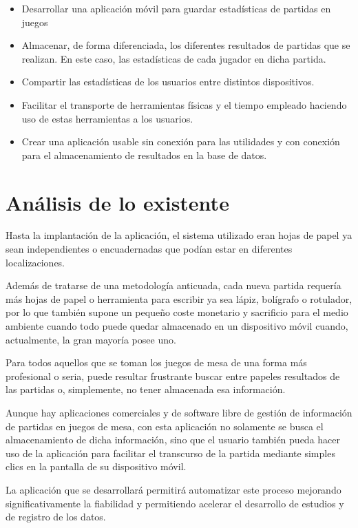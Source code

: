 \begin{itemize}
    \item Desarrollar una aplicación móvil para guardar estadísticas de partidas en juegos
    \item Almacenar, de forma diferenciada, los diferentes resultados de partidas que se realizan. En este caso, las estadísticas de cada jugador en dicha partida.
    \item Compartir las estadísticas de los usuarios entre distintos dispositivos.
    \item Facilitar el transporte de herramientas físicas y el tiempo empleado haciendo uso de estas herramientas a los usuarios.
    \item Crear una aplicación usable sin conexión para las utilidades y con conexión para el almacenamiento de resultados en la base de datos.
\end{itemize}

\newpage

\section{Análisis de lo existente}

Hasta la implantación de la aplicación, el sistema utilizado eran hojas de papel ya sean independientes o encuadernadas que podían estar en diferentes localizaciones.

Además de tratarse de una metodología anticuada, cada nueva partida requería más hojas de papel o herramienta para escribir ya sea lápiz, bolígrafo o rotulador, por lo que también supone un pequeño coste monetario y sacrificio para el medio ambiente cuando todo puede quedar almacenado en un dispositivo móvil cuando, actualmente, la gran mayoría posee uno. 

Para todos aquellos que se toman los juegos de mesa de una forma más profesional o seria, puede resultar frustrante buscar entre papeles resultados de las partidas o, simplemente, no tener almacenada esa información.

Aunque hay aplicaciones comerciales y de software libre de gestión de información de partidas en juegos de mesa, con esta aplicación no solamente se busca el almacenamiento de dicha información, sino que el usuario también pueda hacer uso de la aplicación para facilitar el transcurso de la partida mediante simples clics en la pantalla de su dispositivo móvil.

La aplicación que se desarrollará permitirá automatizar este proceso mejorando significativamente la fiabilidad y permitiendo acelerar el desarrollo de estudios y de registro de los datos.

